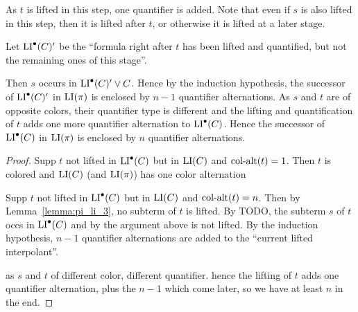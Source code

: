 \documentclass[,%
	draft=false,%
	numbers=noendperiod
	12pt,
	a4paper,
	oneside,%
	openany,
]{memoir}
\begin{document}
{
	\color{gray}
	As $t$ is lifted in this step, one quantifier is added.
	Note that even if $s$ is also lifted in this step, then it is lifted after $t$, or otherwise it is lifted at a later stage.

	Let $\operatorname{LI}^\bullet(C)'$ be the ``formula right after $t$ has been lifted and quantified, but not the remaining ones of this stage''.

	Then $s$ occurs in $\operatorname{LI}^\bullet(C)' \lor C$.
	Hence by the induction hypothesis, the successor of $\operatorname{LI}^\bullet(C)'$ in $\operatorname{LI}(\pi)$ is enclosed by $n-1$ quantifier alternations.
	As $s$ and $t$ are of opposite colors, their quantifier type is different and the lifting and quantification of $t$ adds one more quantifier alternation to $\operatorname{LI}^\bullet(C)$. 
	Hence the successor of $\operatorname{LI}^\bullet(C)$ in $\operatorname{LI}(\pi)$ is enclosed by $n$ quantifier alternations.
}

{
	\color{gray}

	\begin{proof}
		Supp $t$ not lifted in $\operatorname{LI}^\bullet(C)$ but in $\operatorname{LI}(C)$ and $\operatorname{col-alt}(t) = 1$.
		Then $t$ is colored and $\operatorname{LI}(C)$ (and $\operatorname{LI}(\pi)$) has one color alternation

		Supp $t$ not lifted in $\operatorname{LI}^\bullet(C)$ but in $\operatorname{LI}(C)$ and $\operatorname{col-alt}(t) = n$.
		Then by Lemma~\ref{lemma:pi_li_3}, no subterm of $t$ is lifted.
		By TODO, the subterm $s$ of $t$ occs in $\operatorname{LI}^\bullet(C)$ and by the argument above is not lifted.
		By the induction hypothesis, $n-1$ quantifier alternations are added to the ``current lifted interpolant''.

		as $s$ and $t$ of different color, different quantifier.
		hence the lifting of $t$ adds one quantifier alternation, plus the $n-1$ which come later, so we have at least $n$ in the end.
	\end{proof}
}
\end{document}
